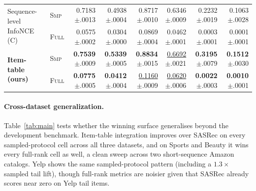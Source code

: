 \documentclass{article}
\begin{document}
\begin{table}[!htbp]
{\begin{tabular}{llrrrrrr}
    \cmidrule(lr){1-8}
    \multirow{2}{*}{Sequence-level InfoNCE (C)}       & \textsc{Smp}  & 0.7183{\tiny$\pm$.0013} & 0.4938{\tiny$\pm$.0004} & 0.8717{\tiny$\pm$.0010} & 0.6346{\tiny$\pm$.0009} & 0.2232{\tiny$\pm$.0019} & 0.1063{\tiny$\pm$.0028} \\
                                                       & \textsc{Full} & 0.0575{\tiny$\pm$.0002} & 0.0304{\tiny$\pm$.0000} & 0.0869{\tiny$\pm$.0004} & 0.0462{\tiny$\pm$.0001} & 0.0003{\tiny$\pm$.0001} & 0.0001{\tiny$\pm$.0001} \\
    \cmidrule(lr){1-8}
    \multirow{2}{*}{\textbf{Item-table (ours)}}       & \textsc{Smp}  & \textbf{0.7539}{\tiny$\pm$.0009} & \textbf{0.5339}{\tiny$\pm$.0005} & \textbf{0.8834}{\tiny$\pm$.0015} & \underline{0.6692}{\tiny$\pm$.0021} & \textbf{0.3195}{\tiny$\pm$.0079} & \textbf{0.1512}{\tiny$\pm$.0030} \\
                                                       & \textsc{Full} & \textbf{0.0775}{\tiny$\pm$.0005} & \textbf{0.0412}{\tiny$\pm$.0004} & \underline{0.1160}{\tiny$\pm$.0009} & \underline{0.0620}{\tiny$\pm$.0006} & \textbf{0.0022}{\tiny$\pm$.0003} & \textbf{0.0010}{\tiny$\pm$.0001} \\
    \bottomrule
  \end{tabular}}%
\end{table}

\paragraph{Cross-dataset generalization.}
Table~\ref{tab:main} tests whether the winning surface generalises
beyond the development benchmark. Item-table integration improves over SASRec on every
sampled-protocol cell across all three datasets, and on Sports
and Beauty it wins every full-rank cell as well, a clean
sweep across two short-sequence Amazon catalogs. Yelp shows the
same sampled-protocol pattern (including a $1.3\times$ sampled tail
lift), though full-rank metrics are noisier given that SASRec
already scores near zero on Yelp tail items.
\end{document}
